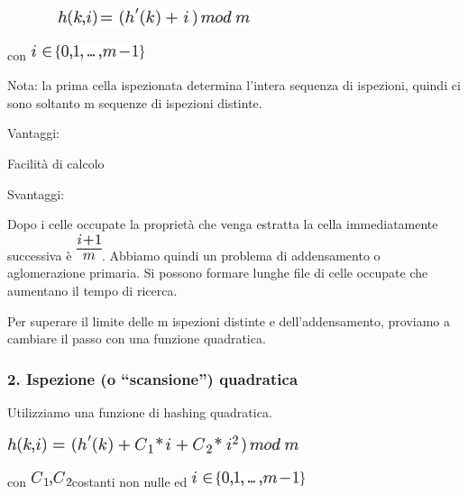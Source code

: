 \documentclass{article}
\begin{document}
{}

{~~~~~~~~}\includegraphics{images/image287.png}

{con }\includegraphics{images/image288.png}

{}

{Nota: la prima cella ispezionata determina l'intera sequenza di
ispezioni, }{quindi ci sono soltanto m sequenze di ispezioni distinte.}

{Vantaggi}{: }

{Facilità di calcolo}

{Svantaggi}{: }

{Dopo }{i }{celle occupate la proprietà che venga estratta la cella
immediatamente successiva è }\includegraphics{images/image289.png}{.
Abbiamo quindi un problema di }{addensamento o aglomerazione primaria}{.
Si possono formare lunghe file di celle occupate che aumentano il tempo
di ricerca.}

{}

{Per superare il limite delle m ispezioni distinte e dell'addensamento,
proviamo a cambiare il passo con una funzione quadratica.}

\hypertarget{h.83xwipol2nwy}{\subsubsection{\texorpdfstring{{2.
Ispezione (o ``scansione'')
quadratica}}{2. Ispezione (o scansione) quadratica}}\label{h.83xwipol2nwy}}

{Utilizziamo una funzione di hashing quadratica.}

\includegraphics{images/image290.png}

{con }\includegraphics{images/image291.png}{costanti non nulle ed
}\includegraphics{images/image288.png}
\end{document}
